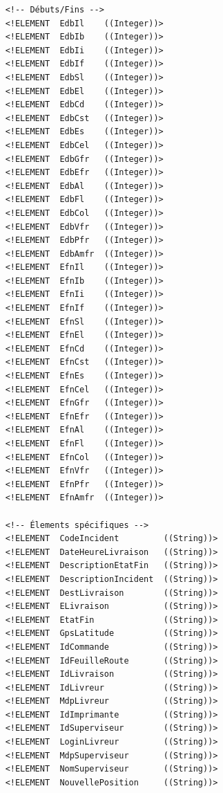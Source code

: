 \documentclass{report}
\begin{document}
\begin{appendices}
\begin{verbatim}
    <!-- Débuts/Fins -->
    <!ELEMENT  EdbIl    ((Integer))>
    <!ELEMENT  EdbIb    ((Integer))>
    <!ELEMENT  EdbIi    ((Integer))>
    <!ELEMENT  EdbIf    ((Integer))>
    <!ELEMENT  EdbSl    ((Integer))>
    <!ELEMENT  EdbEl    ((Integer))>
    <!ELEMENT  EdbCd    ((Integer))>
    <!ELEMENT  EdbCst   ((Integer))>
    <!ELEMENT  EdbEs    ((Integer))>
    <!ELEMENT  EdbCel   ((Integer))>
    <!ELEMENT  EdbGfr   ((Integer))>
    <!ELEMENT  EdbEfr   ((Integer))>
    <!ELEMENT  EdbAl    ((Integer))>
    <!ELEMENT  EdbFl    ((Integer))>
    <!ELEMENT  EdbCol   ((Integer))>
    <!ELEMENT  EdbVfr   ((Integer))>
    <!ELEMENT  EdbPfr   ((Integer))>
    <!ELEMENT  EdbAmfr  ((Integer))>
    <!ELEMENT  EfnIl    ((Integer))>
    <!ELEMENT  EfnIb    ((Integer))>
    <!ELEMENT  EfnIi    ((Integer))>
    <!ELEMENT  EfnIf    ((Integer))>
    <!ELEMENT  EfnSl    ((Integer))>
    <!ELEMENT  EfnEl    ((Integer))>
    <!ELEMENT  EfnCd    ((Integer))>
    <!ELEMENT  EfnCst   ((Integer))>
    <!ELEMENT  EfnEs    ((Integer))>
    <!ELEMENT  EfnCel   ((Integer))>
    <!ELEMENT  EfnGfr   ((Integer))>
    <!ELEMENT  EfnEfr   ((Integer))>
    <!ELEMENT  EfnAl    ((Integer))>
    <!ELEMENT  EfnFl    ((Integer))>
    <!ELEMENT  EfnCol   ((Integer))>
    <!ELEMENT  EfnVfr   ((Integer))>
    <!ELEMENT  EfnPfr   ((Integer))>
    <!ELEMENT  EfnAmfr  ((Integer))>

    <!-- Élements spécifiques -->
    <!ELEMENT  CodeIncident         ((String))>
    <!ELEMENT  DateHeureLivraison   ((String))>
    <!ELEMENT  DescriptionEtatFin   ((String))>
    <!ELEMENT  DescriptionIncident  ((String))>
    <!ELEMENT  DestLivraison        ((String))>
    <!ELEMENT  ELivraison           ((String))>
    <!ELEMENT  EtatFin              ((String))>
    <!ELEMENT  GpsLatitude          ((String))>
    <!ELEMENT  IdCommande           ((String))>
    <!ELEMENT  IdFeuilleRoute       ((String))>
    <!ELEMENT  IdLivraison          ((String))>
    <!ELEMENT  IdLivreur            ((String))>
    <!ELEMENT  MdpLivreur           ((String))>
    <!ELEMENT  IdImprimante         ((String))>
    <!ELEMENT  IdSuperviseur        ((String))>
    <!ELEMENT  LoginLivreur         ((String))>
    <!ELEMENT  MdpSuperviseur       ((String))>
    <!ELEMENT  NomSuperviseur       ((String))>
    <!ELEMENT  NouvellePosition     ((String))>


\end{verbatim}
\end{appendices}
\end{document}
